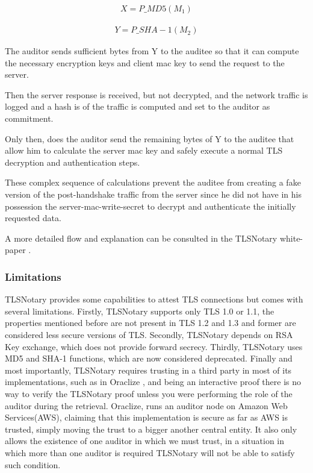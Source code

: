 \begin{ceqn}
    \begin{align}
        X = P\_MD5(M_{1})
    \end{align}
\end{ceqn}

\begin{ceqn}
    \begin{align}
        Y = P\_SHA-1(M_{2})
    \end{align}
\end{ceqn}

The auditor sends sufficient bytes from Y to the auditee so that it can compute the necessary encryption keys and client mac key to send the request to the server.

Then the server response is received, but not decrypted, and the network traffic is logged and a hash is of the traffic is computed and set to the auditor as commitment.

Only then, does the auditor send the remaining bytes of Y to the auditee that allow him to calculate the server mac key and safely execute a normal TLS decryption and authentication steps.

These complex sequence of calculations prevent the auditee from creating a fake version of the post-handshake traffic from the server since he did not have in his possession the server-mac-write-secret to decrypt and authenticate the initially requested data.

A more detailed flow and explanation can be consulted in the TLSNotary white-paper \cite{2014TLSnotary-aSessions}.


\subsubsection{Limitations}
TLSNotary provides some capabilities to attest TLS connections but comes with several limitations. Firstly, TLSNotary supports only TLS 1.0 or 1.1, the properties mentioned before are not present in TLS 1.2 and 1.3 and former are considered less secure versions of TLS. Secondly, TLSNotary depends on RSA Key exchange, which does not provide forward secrecy. Thirdly, TLSNotary uses MD5 and SHA-1 functions, which are now considered deprecated. Finally and most importantly, TLSNotary requires trusting in a third party in most of its implementations, such as in Oraclize \cite{Oraclize.it2018OraclizeDocumentation}, and being an interactive proof there is no way to verify the TLSNotary proof unless you were performing the role of the auditor during the retrieval. Oraclize, runs an auditor node on Amazon Web Services(AWS), claiming that this implementation is secure as far as AWS is trusted, simply moving the trust to a bigger another central entity. It also only allows the existence of one auditor in which we must trust, in a situation in which more than one auditor is required TLSNotary will not be able to satisfy such condition.


